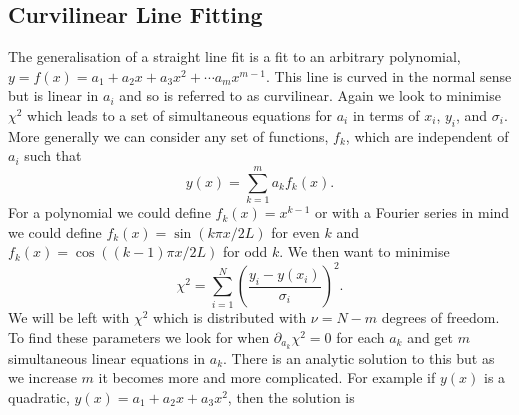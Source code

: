 \documentclass[a4paper]{article}
\begin{document}
    \subsection{Curvilinear Line Fitting}
    The generalisation of a straight line fit is a fit to an arbitrary polynomial, \(y = f(x) = a_1 + a_2x + a_3x^2 + \dotsm a_mx^{m-1}\).
    This line is curved in the normal sense but is linear in \(a_i\) and so is referred to as curvilinear.
    Again we look to minimise \(\chi^2\) which leads to a set of simultaneous equations for \(a_i\) in terms of \(x_i\), \(y_i\), and \(\sigma_i\).
    More generally we can consider any set of functions, \(f_k\), which are independent of \(a_i\) such that
    \[y(x) = \sum_{k=1}^{m}a_kf_k(x).\]
    For a polynomial we could define \(f_k(x) = x^{k-1}\) or with a Fourier series in mind we could define \(f_k(x) = \sin(k\pi x/ 2L)\) for even \(k\) and \(f_k(x) = \cos((k - 1)\pi x/2L)\) for odd \(k\).
    We then want to minimise
    \[\chi^2 = \sum_{i=1}^{N} \left(\frac{y_i - y(x_i)}{\sigma_i}\right)^2.\]
    We will be left with \(\chi^2\) which is distributed with \(\nu = N - m\) degrees of freedom.
    To find these parameters we look for when \(\partial_{a_k}\chi^2 = 0\) for each \(a_k\) and get \(m\) simultaneous linear equations in \(a_k\).
    There is an analytic solution to this but as we increase \(m\) it becomes more and more complicated.
    For example if \(y(x)\) is a quadratic, \(y(x) = a_1 + a_2x + a_3x^2\), then the solution is
\end{document}
